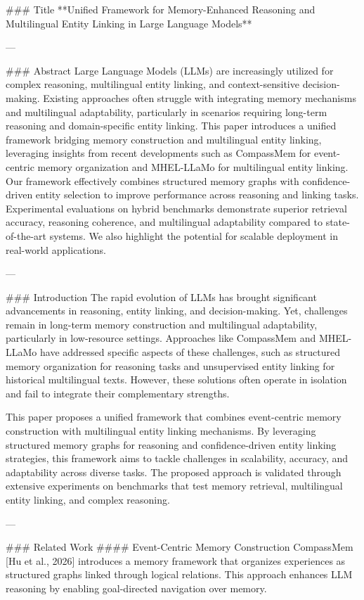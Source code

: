 ### Title  
**Unified Framework for Memory-Enhanced Reasoning and Multilingual Entity Linking in Large Language Models**  

---

### Abstract  
Large Language Models (LLMs) are increasingly utilized for complex reasoning, multilingual entity linking, and context-sensitive decision-making. Existing approaches often struggle with integrating memory mechanisms and multilingual adaptability, particularly in scenarios requiring long-term reasoning and domain-specific entity linking. This paper introduces a unified framework bridging memory construction and multilingual entity linking, leveraging insights from recent developments such as CompassMem for event-centric memory organization and MHEL-LLaMo for multilingual entity linking. Our framework effectively combines structured memory graphs with confidence-driven entity selection to improve performance across reasoning and linking tasks. Experimental evaluations on hybrid benchmarks demonstrate superior retrieval accuracy, reasoning coherence, and multilingual adaptability compared to state-of-the-art systems. We also highlight the potential for scalable deployment in real-world applications.  

---

### Introduction  
The rapid evolution of LLMs has brought significant advancements in reasoning, entity linking, and decision-making. Yet, challenges remain in long-term memory construction and multilingual adaptability, particularly in low-resource settings. Approaches like CompassMem and MHEL-LLaMo have addressed specific aspects of these challenges, such as structured memory organization for reasoning tasks and unsupervised entity linking for historical multilingual texts. However, these solutions often operate in isolation and fail to integrate their complementary strengths.  

This paper proposes a unified framework that combines event-centric memory construction with multilingual entity linking mechanisms. By leveraging structured memory graphs for reasoning and confidence-driven entity linking strategies, this framework aims to tackle challenges in scalability, accuracy, and adaptability across diverse tasks. The proposed approach is validated through extensive experiments on benchmarks that test memory retrieval, multilingual entity linking, and complex reasoning.  

---

### Related Work  
#### Event-Centric Memory Construction  
CompassMem [Hu et al., 2026] introduces a memory framework that organizes experiences as structured graphs linked through logical relations. This approach enhances LLM reasoning by enabling goal-directed navigation over memory.  

